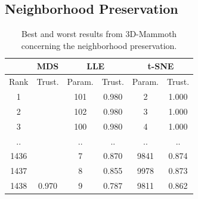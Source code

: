 \subsection{Neighborhood Preservation}

\begin{table}[]
\centering
\begin{tabular}{|c|cl|cc|cc|}
\hline
 & \multicolumn{2}{c|}{{\color[HTML]{1B9E77} \textbf{MDS}}} & \multicolumn{2}{c|}{{\color[HTML]{D95F02} \textbf{LLE}}} & \multicolumn{2}{c|}{{\color[HTML]{7570B3} \textbf{t-SNE}}} \\ \hline
Rank & \multicolumn{2}{c|}{Trust.} & \multicolumn{1}{c|}{Param.} & Trust. & \multicolumn{1}{c|}{Param.} & Trust. \\ \hline
1 & \multicolumn{2}{c|}{} & \multicolumn{1}{c|}{101} & 0.980 & \multicolumn{1}{c|}{2} & 1.000 \\ \cline{1-1} \cline{4-7} 
2 & \multicolumn{2}{c|}{} & \multicolumn{1}{c|}{102} & 0.980 & \multicolumn{1}{c|}{3} & 1.000 \\ \cline{1-1} \cline{4-7} 
3 & \multicolumn{2}{c|}{} & \multicolumn{1}{c|}{100} & 0.980 & \multicolumn{1}{c|}{4} & 1.000 \\ \cline{1-1} \cline{4-7} 
.. & \multicolumn{2}{c|}{} & \multicolumn{1}{c|}{..} & .. & \multicolumn{1}{c|}{..} & .. \\ \cline{1-1} \cline{4-7} 
1436 & \multicolumn{2}{c|}{} & \multicolumn{1}{c|}{7} & 0.870 & \multicolumn{1}{c|}{9841} & 0.874 \\ \cline{1-1} \cline{4-7} 
1437 & \multicolumn{2}{c|}{} & \multicolumn{1}{c|}{8} & 0.855 & \multicolumn{1}{c|}{9978} & 0.873 \\ \cline{1-1} \cline{4-7} 
1438 & \multicolumn{2}{c|}{\multirow{-7}{*}{0.970}} & \multicolumn{1}{c|}{9} & 0.787 & \multicolumn{1}{c|}{9811} & 0.862 \\ \hline
\end{tabular}
\caption[3D-Mammoth Neighborhood Preservation]{Best and worst results from 3D-Mammoth concerning the neighborhood preservation.}
\label{tab:best_worst_1nn_mammoth}
\end{table}

